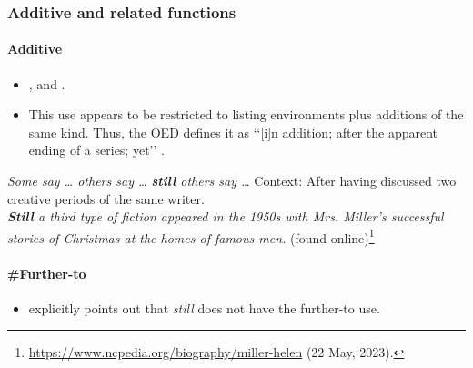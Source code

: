 \subsubsection{Additive and related functions}
\paragraph{Additive}\label{appendixEnglishAdditive}
\begin{itemize}
	\item \textcite[145]{Koenig1991}, \textcite[198–201]{Ranger2018} and \textcite[s.v. \textit{still}]{OED2022}.
	\item This use appears to be restricted to listing environments plus additions of the same kind.
	 Thus, the OED defines it as \lq\lq [i]n addition; after the apparent ending of a series; yet\rq\rq{ }\parencite[ s.v. still]{OED2022}.
\end{itemize}

\begin{exe}
	\sloppy
	\ex \textit{Some say … others say … \textbf{still} others say …} \parencite[145]{Koenig1991}
	\ex Context: After having discussed two creative periods of the same writer.\\
	\textit{\textbf{Still} a third type of fiction appeared in the 1950s with Mrs. Miller's successful stories of Christmas at the homes of famous men.} (found online)\footnote{\url{https://www.ncpedia.org/biography/miller-helen} (22 May, 2023).}
\end{exe}

\paragraph{\#Further-to}
\begin{itemize}
	\item\textcite{Beck2020} explicitly points out that \textit{still} does not have the further-to use.
\end{itemize}

